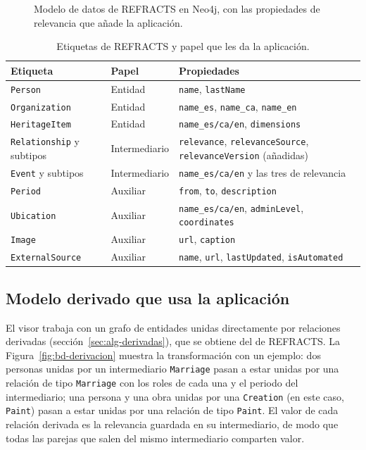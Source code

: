 \begin{figure}
  \centering
  \caption{Modelo de datos de REFRACTS en Neo4j, con las propiedades de relevancia que añade la aplicación.}
  \label{fig:bd-refracts}
\end{figure}

\begin{table}[htbp]
\centering
\small
\caption{Etiquetas de REFRACTS y papel que les da la aplicación.}
\label{tab:etiquetas}
\begin{tabular}{|p{}|p{}|p{}|}
\hline
\textbf{Etiqueta} & \textbf{Papel} & \textbf{Propiedades} \\ \hline
\texttt{Person} & Entidad & \texttt{name}, \texttt{lastName} \\ \hline
\texttt{Organization} & Entidad & \texttt{name\_es}, \texttt{name\_ca}, \texttt{name\_en} \\ \hline
\texttt{HeritageItem} & Entidad & \texttt{name\_es/ca/en}, \texttt{dimensions} \\ \hline
\texttt{Relationship} y subtipos & Intermediario & \texttt{relevance}, \texttt{relevanceSource}, \texttt{relevanceVersion} (añadidas) \\ \hline
\texttt{Event} y subtipos & Intermediario & \texttt{name\_es/ca/en} y las tres de relevancia \\ \hline
\texttt{Period} & Auxiliar & \texttt{from}, \texttt{to}, \texttt{description} \\ \hline
\texttt{Ubication} & Auxiliar & \texttt{name\_es/ca/en}, \texttt{adminLevel}, \texttt{coordinates} \\ \hline
\texttt{Image} & Auxiliar & \texttt{url}, \texttt{caption} \\ \hline
\texttt{ExternalSource} & Auxiliar & \texttt{name}, \texttt{url}, \texttt{lastUpdated}, \texttt{isAutomated} \\ \hline
\end{tabular}
\end{table}

\subsection{Modelo derivado que usa la aplicación}

El visor trabaja con un grafo de entidades unidas directamente por relaciones derivadas (sección~\ref{sec:alg-derivadas}), que se obtiene del de REFRACTS. La Figura~\ref{fig:bd-derivacion} muestra la transformación con un ejemplo: dos personas unidas por un intermediario \texttt{Marriage} pasan a estar unidas por una relación de tipo \texttt{Marriage} con los roles de cada una y el periodo del intermediario; una persona y una obra unidas por una \texttt{Creation} (en este caso, \texttt{Paint}) pasan a estar unidas por una relación de tipo \texttt{Paint}. El valor de cada relación derivada es la relevancia guardada en su intermediario, de modo que todas las parejas que salen del mismo intermediario comparten valor.

